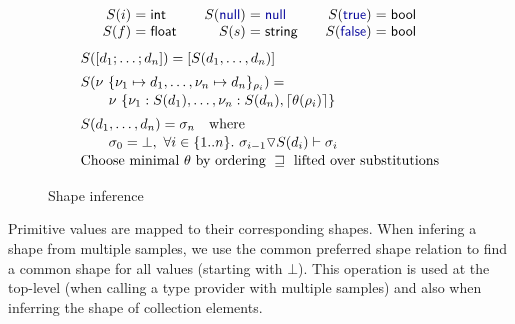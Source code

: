 \documentclass[10pt,preprint,blind,clearpagebib]{sigplanconf}
\newcommand{\kvd}[1]{\textnormal{\textcolor{kvdclr}{\sffamily #1}}}
\newcommand{\ident}[1]{\textnormal{\sffamily #1}}
\newcommand{\narrow}[1]{\hspace{-0.7em} #1 \hspace{-0.7em}}
\newcommand{\addopt}[1]{\lceil#1\rceil}
\newcommand{\semalt}[1]{S(#1)}
\begin{document}
\begin{figure}
\noindent
\begin{equation*}
\begin{array}{rclcrclcrcl}
 \semalt{i} &\narrow{=}& \ident{int} && \semalt{\kvd{null}}  &\narrow{=}& \kvd{null} && \semalt{\kvd{true}} &\narrow{=}& \ident{bool}\\
 \semalt{f} &\narrow{=}& \ident{float} && \semalt{s} &\narrow{=}& \ident{string} && \semalt{\kvd{false}}  &\narrow{=}& \ident{bool}\\
\end{array}
\end{equation*}
\noindent
\vspace{-0.5em}
\begin{equation*}
\begin{array}{l}
 \semalt{[d_1; \ldots; d_n]} = [\semalt{d_1, \ldots, d_n}]
 \\[0.5em]
 \semalt{\nu~\{ \nu_1 \mapsto d_1, \ldots, \nu_n \mapsto d_n \}_{\rho_i}} =\\[0.1em]
 \qquad\nu~\{ \nu_1:\semalt{d_1}, \ldots, \nu_n :\semalt{d_n}, \addopt{\theta(\rho_i)} \}
 \\[0.5em]
 \semalt{d_1, \ldots, d_n} = \sigma_n \quad\textnormal{where}\\[0.1em]
 \qquad\sigma_0 = \bot,~ \forall i\in \{ 1.. n \}.~ \sigma_{i-1} \triangledown \semalt{d_i} \vdash \sigma_i \\[0.1em]
 \textnormal{Choose minimal}\ \theta\ \textnormal{by ordering}\ \sqsupseteq\ \textnormal{lifted over substitutions} \\[0.1em]
\end{array}
\end{equation*}
\caption{Shape inference}
\label{fig:shape-inference}
\end{figure}

%
Primitive  values are mapped to their corresponding shapes. 
When infering a shape from multiple samples, we use the common preferred shape relation to find a 
common shape for all values (starting with $\bot$). This operation is used at the top-level 
(when calling a type provider with multiple samples) and also when inferring the shape of collection
elements.




\end{document}
